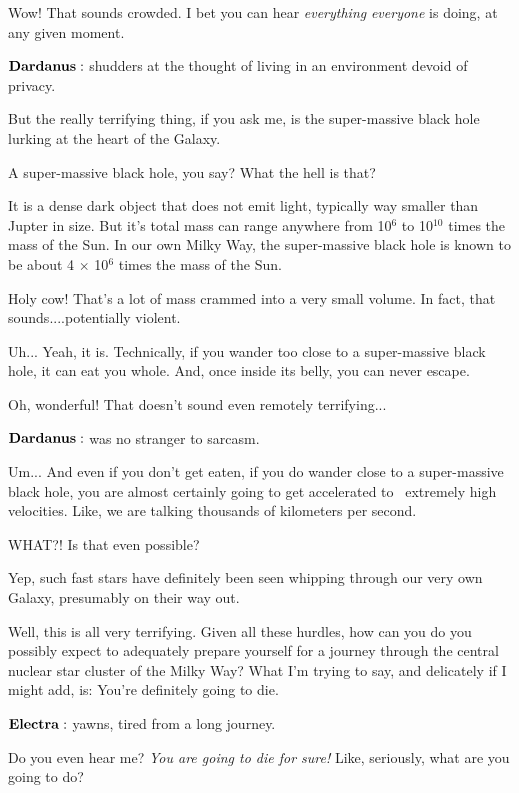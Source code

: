 \documentclass[main.tex]{subfiles}
\begin{document}
\Dardanus  Wow!  That sounds crowded.  I bet you can hear \textit{everything} \textit{everyone} is doing, at any given moment.  

$\Dardanus$ shudders at the thought of living in an environment devoid of privacy.

\Electra But the really terrifying thing, if you ask me, is the super-massive black hole lurking at the heart of the Galaxy.

\Dardanus A super-massive black hole, you say?  What the hell is that?

\Electra It is a dense dark object that does not emit light, typically way smaller than Jupter in size.  But it's total mass can range anywhere from 10$^6$ to 10$^{10}$ times the mass of the Sun.  In our own Milky Way, the super-massive black hole is known to be about 4 $\times$ 10$^6$ times the mass of the Sun.

\Dardanus Holy cow!  That's a lot of mass crammed into a very small volume.  In fact, that sounds....potentially violent.

\Electra Uh... Yeah, it is.  Technically, if you wander too close to a super-massive black hole, it can eat you whole.  And, once inside its belly, you can never escape.

\Dardanus  Oh, wonderful!  That doesn't sound even remotely terrifying...

$\Dardanus$ was no stranger to sarcasm.

\Electra Um... And even if you don't get eaten, if you do wander close to a super-massive black hole, you are almost certainly going to get accelerated to \
extremely high velocities.  Like, we are talking thousands of kilometers per second.

\Dardanus  WHAT?!  Is that even possible?

\Electra  Yep, such fast stars have definitely been seen whipping through our very own Galaxy, presumably on their way out.

\Dardanus Well, this is all very terrifying.  Given all these hurdles, how can you do you possibly expect to adequately prepare yourself for a journey through the central nuclear star cluster of the Milky Way?  What I'm trying to say, and delicately if I might add, is:  You're definitely going to die.

$\Electra$ yawns, tired from a long journey.

\Dardanus  Do you even hear me?  \textit{You are going to die for sure!}  Like, seriously, what are you going to do?
\end{document}
